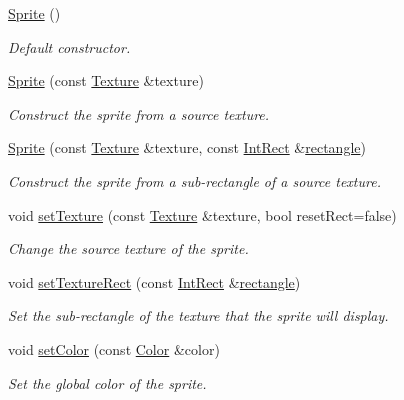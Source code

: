 \begin{DoxyCompactItemize}
\item 
\hyperlink{classsf_1_1_sprite_a92559fbca895a96758abf5eabab96984}{Sprite} ()
\begin{DoxyCompactList}\small\item\em Default constructor. \end{DoxyCompactList}\item 
\hyperlink{classsf_1_1_sprite_a2a9fca374d7abf084bb1c143a879ff4a}{Sprite} (const \hyperlink{classsf_1_1_texture}{Texture} \&texture)
\begin{DoxyCompactList}\small\item\em Construct the sprite from a source texture. \end{DoxyCompactList}\item 
\hyperlink{classsf_1_1_sprite_a01cfe1402372d243dbaa2ffa96020206}{Sprite} (const \hyperlink{classsf_1_1_texture}{Texture} \&texture, const \hyperlink{classsf_1_1_rect}{Int\+Rect} \&\hyperlink{structrectangle}{rectangle})
\begin{DoxyCompactList}\small\item\em Construct the sprite from a sub-\/rectangle of a source texture. \end{DoxyCompactList}\item 
void \hyperlink{classsf_1_1_sprite_a3729c88d88ac38c19317c18e87242560}{set\+Texture} (const \hyperlink{classsf_1_1_texture}{Texture} \&texture, bool reset\+Rect=false)
\begin{DoxyCompactList}\small\item\em Change the source texture of the sprite. \end{DoxyCompactList}\item 
void \hyperlink{classsf_1_1_sprite_a3fefec419a4e6a90c0fd54c793d82ec2}{set\+Texture\+Rect} (const \hyperlink{classsf_1_1_rect}{Int\+Rect} \&\hyperlink{structrectangle}{rectangle})
\begin{DoxyCompactList}\small\item\em Set the sub-\/rectangle of the texture that the sprite will display. \end{DoxyCompactList}\item 
void \hyperlink{classsf_1_1_sprite_a14def44da6437bfea20c4df5e71aba4c}{set\+Color} (const \hyperlink{classsf_1_1_color}{Color} \&color)
\begin{DoxyCompactList}\small\item\em Set the global color of the sprite. \end{DoxyCompactList}\item 

\end{DoxyCompactItemize}
